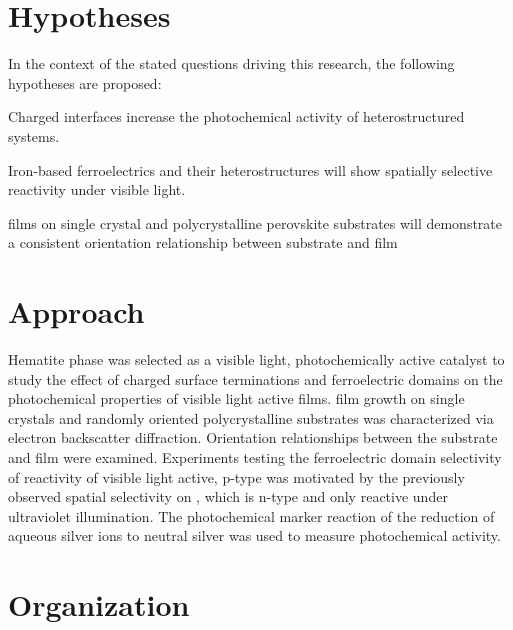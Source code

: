 \section{Hypotheses}\label{sec:intro.hypotheses}
In the context of the stated questions driving this research, the following 
hypotheses are proposed:

\begin{items}

	\item Charged interfaces increase the photochemical activity of 
	heterostructured systems.
	
	\item Iron-based ferroelectrics and their heterostructures will show
	spatially selective reactivity under visible light.
	
	\item {} films on  single crystal and polycrystalline 
	perovskite substrates will demonstrate a consistent orientation 
	relationship between substrate and film
	
\end{items}


\section{Approach}
\label{sec:intro.approach}


Hematite phase  was selected as a visible light, photochemically 
active catalyst to study the effect of charged surface terminations and 
ferroelectric domains on the photochemical properties of visible light 
active films.  film growth on  single crystals and 
randomly oriented polycrystalline  substrates was characterized 
via electron backscatter diffraction. Orientation relationships between the 
substrate and film were examined. Experiments testing the ferroelectric 
domain selectivity of reactivity of visible light active, p-type 
 was motivated by the previously observed spatial selectivity on 
, which is n-type and only reactive under ultraviolet 
illumination. The photochemical marker reaction of the reduction of aqueous 
silver ions to neutral silver was used to measure photochemical activity.


\section{Organization}
\label{sec:intro.organization}


